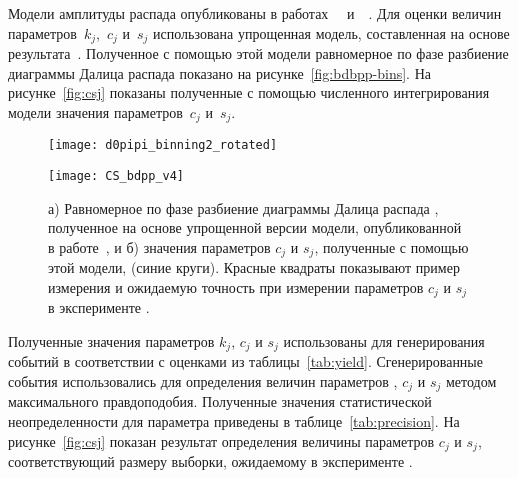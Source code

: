 Модели амплитуды распада \bdbpp опубликованы в работах~\belle~\cite{kuzmin_model} и~\lhcb~\cite{lhcb_bdpp}.  Для оценки величин параметров~$k_j$,~$c_j$ и~$s_j$ использована упрощенная модель, составленная на основе результата~\cite{kuzmin_model}.  Полученное с помощью этой модели равномерное по фазе разбиение диаграммы Далица распада \bdbpp показано на рисунке~\ref{fig:bdbpp-bins}.  На рисунке~\ref{fig:csj} показаны полученные с помощью численного интегрирования модели значения параметров~$c_j$ и~$s_j$.  

\begin{figure}[htb]
\begin{minipage}[b]{0.5\textwidth}
 \centering
  \texttt{[image: d0pipi\_binning2\_rotated]}
 \subcaption{}
 \label{fig:bdbpp-bins}
\end{minipage}
\begin{minipage}[b]{0.5\textwidth}
 \centering
  \texttt{[image: CS\_bdpp\_v4]}
 \subcaption{}
 \label{fig:csj}
\end{minipage}
 \caption{а) Равномерное по фазе разбиение диаграммы Далица распада \bdbpp, полученное на основе упрощенной версии модели, опубликованной в работе~\cite{kuzmin_model}, и б) значения параметров $c_j$ и $s_j$, полученные с помощью этой модели, (синие круги).  Красные квадраты показывают пример измерения и ожидаемую точность при измерении параметров $c_j$ и $s_j$ в эксперименте \belleii.}
 \label{fig:bdbpp}
\end{figure}

Полученные значения параметров $k_j$, $c_j$ и $s_j$ использованы для генерирования событий в соответствии с оценками из таблицы~\ref{tab:yield}.  Сгенерированные события использовались для определения величин параметров \pphi, $c_j$ и $s_j$ методом максимального правдоподобия.  Полученные значения статистической неопределенности для параметра \pphi приведены в таблице~\ref{tab:precision}.  На рисунке~\ref{fig:csj} показан результат определения величины параметров $c_j$ и $s_j$, соответствующий размеру выборки, ожидаемому в эксперименте \belleii.

